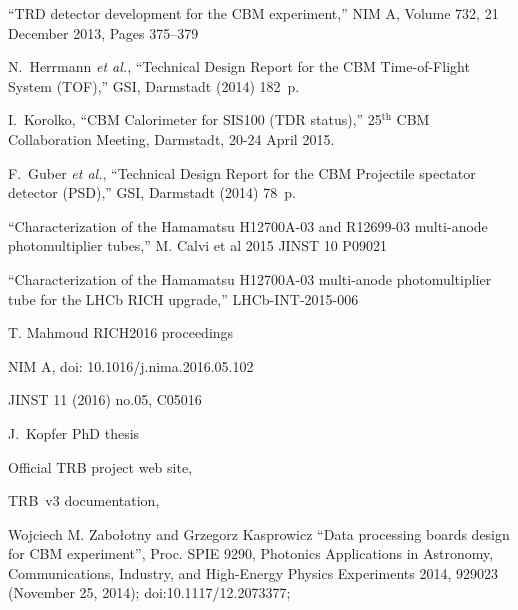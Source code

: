 \begin{thebibliography}{99}
``TRD detector development for the CBM experiment,''
NIM A, Volume 732, 21 December 2013, Pages 375–379

N.~Herrmann {\it et al.}, ``Technical Design Report for the CBM Time-of-Flight System (TOF),'' GSI, Darmstadt (2014) 182~p.

I.~Korolko, ``CBM Calorimeter for SIS100 (TDR status),'' 25$^\mathrm{th}$ CBM Collaboration Meeting, Darmstadt, 20-24 April 2015.\\

F.~Guber {\it et al.}, ``Technical Design Report for the CBM Projectile spectator detector (PSD),'' GSI, Darmstadt (2014) 78~p.



``Characterization of the Hamamatsu H12700A-03 and R12699-03 multi-anode photomultiplier tubes,''
M. Calvi et al 2015 JINST 10 P09021 

``Characterization of the Hamamatsu H12700A-03 multi-anode photomultiplier tube for the LHCb RICH upgrade,''
LHCb-INT-2015-006


T. Mahmoud RICH2016 proceedings

NIM A, doi: 10.1016/j.nima.2016.05.102

JINST 11 (2016) no.05, C05016

J.~Kopfer PhD thesis


Official TRB project web site,

TRB~v3 documentation,

Wojciech M. Zabołotny and Grzegorz Kasprowicz
``Data processing boards design for CBM experiment'',
Proc. SPIE 9290, Photonics Applications in Astronomy, Communications, Industry, and High-Energy Physics Experiments 2014, 929023 (November 25, 2014); doi:10.1117/12.2073377;


\end{thebibliography}
